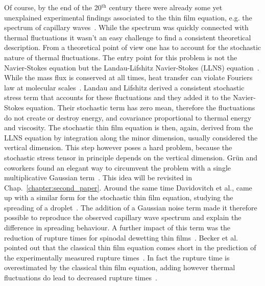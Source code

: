 Of course, by the end of the 20$^{\text{th}}$ century there were already some yet unexplained experimental findings associated to the thin film equation, e.g. the spectrum of capillary waves~\cite{vrijRuptureThinLiquid1968}.
While the spectrum was quickly connected with thermal fluctuations it wasn't an easy challenge to find a consistent theoretical description.
From a theoretical point of view one has to account for the stochastic nature of thermal fluctuations.
The entry point for this problem is not the Navier-Stokes equation but the Landau-Lifshitz Navier-Stokes (LLNS) equation~\cite{landauFluidMechanicsLandau2013}.
While the mass flux is conserved at all times, heat transfer can violate Fouriers law at molecular scales~\cite{bellNumericalMethodsStochastic2007}.
Landau and Lifshitz derived a consistent stochastic stress term that accounts for these fluctuations and they added it to the Navier-Stokes equation.
Their stochastic term has zero mean, therefore the fluctuations do not create or destroy energy, and covariance proportional to thermal energy and viscosity. 
The stochastic thin film equation is then, again, derived from the LLNS equation by integration along the minor dimension, usually considered the vertical dimension.
This step however poses a hard problem, because the stochastic stress tensor in principle depends on the vertical dimension.
Grün and coworkers found an elegant way to circumvent the problem with a single multiplicative Gaussian term~\cite{grunThinFilmFlowInfluenced2006, meckeThermalFluctuationsThin2005, fetzerThermalNoiseInfluences2007, zhangNanoscaleThinfilmFlows2020, zhangMolecularSimulationThin2019, nesicFullyNonlinearDynamics2015}. 
This idea will be revisited in Chap.~\ref{chapter:second_paper}.
Around the same time Davidovitch et al., came up with a similar form for the stochastic thin film equation, studying the spreading of a droplet~\cite{davidovitchSpreadingViscousFluid2005}.
The addition of a Gaussian noise term made it therefore possible to reproduce the observed capillary wave spectrum and explain the difference in spreading behaviour.
A further impact of this term was the reduction of rupture times for spinodal dewetting thin films~\cite{grunThinFilmFlowInfluenced2006, fetzerThermalNoiseInfluences2007}.
Becker et al. pointed out that the classical thin film equation comes short in the prediction of the experimentally measured rupture times~\cite{beckerComplexDewettingScenarios2003}.
In fact the rupture time is overestimated by the classical thin film equation, adding however thermal fluctuations do lead to decreased rupture times~\cite{duran-olivenciaInstabilityRuptureFluctuations2019, shahThermalFluctuationsCapillary2019}.

